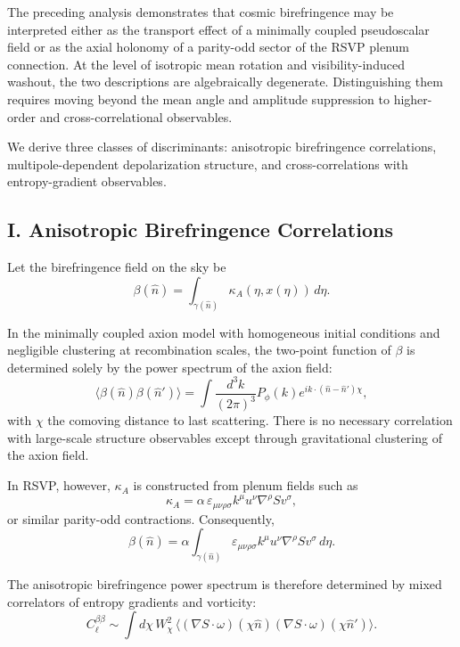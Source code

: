 \documentclass[12pt]{article}
\begin{document}
The preceding analysis demonstrates that cosmic birefringence may be interpreted either as the transport effect of a minimally coupled pseudoscalar field or as the axial holonomy of a parity-odd sector of the RSVP plenum connection. At the level of isotropic mean rotation and visibility-induced washout, the two descriptions are algebraically degenerate. Distinguishing them requires moving beyond the mean angle and amplitude suppression to higher-order and cross-correlational observables.

We derive three classes of discriminants: anisotropic birefringence correlations, multipole-dependent depolarization structure, and cross-correlations with entropy-gradient observables.

\subsection*{I. Anisotropic Birefringence Correlations}

Let the birefringence field on the sky be
\begin{equation}
\beta(\hat n)
=
\int_{\gamma(\hat n)}
\kappa_A(\eta, x(\eta))\, d\eta.
\end{equation}

In the minimally coupled axion model with homogeneous initial conditions and negligible clustering at recombination scales, the two-point function of $\beta$ is determined solely by the power spectrum of the axion field:
\begin{equation}
\langle \beta(\hat n)\beta(\hat n') \rangle
=
\int \frac{d^3k}{(2\pi)^3}
P_\phi(k)
e^{ik\cdot(\hat n - \hat n')\chi},
\end{equation}
with $\chi$ the comoving distance to last scattering. There is no necessary correlation with large-scale structure observables except through gravitational clustering of the axion field.

In RSVP, however, $\kappa_A$ is constructed from plenum fields such as
\begin{equation}
\kappa_A
=
\alpha \,
\varepsilon_{\mu\nu\rho\sigma}
k^\mu
u^\nu
\nabla^\rho S
v^\sigma,
\end{equation}
or similar parity-odd contractions. Consequently,
\begin{equation}
\beta(\hat n)
=
\alpha
\int_{\gamma(\hat n)}
\varepsilon_{\mu\nu\rho\sigma}
k^\mu u^\nu
\nabla^\rho S
v^\sigma
\, d\eta.
\end{equation}

The anisotropic birefringence power spectrum is therefore determined by mixed correlators of entropy gradients and vorticity:
\begin{equation}
C_\ell^{\beta\beta}
\sim
\int d\chi \,
W_\chi^2
\,
\langle
(\nabla S \cdot \omega)(\chi\hat n)
(\nabla S \cdot \omega)(\chi\hat n')
\rangle.
\end{equation}
\end{document}
